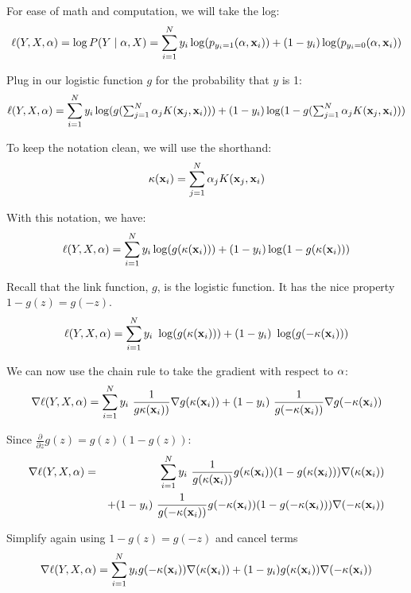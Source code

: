 \documentclass[11pt]{article}
\newcommand{\va}{{\bf \alpha}}
\newcommand{\vx}{{\bf x}}
\newcommand{\vxi}{{\bf x}_i}
\newcommand{\yi}{y_i}
\begin{document}
For ease of math and computation, we will take the log:
\begin{equation}
\ell(Y,X,\va) = \log P(Y \mid \va, X) = \sum_{i=1}^N{ \yi \log(p_{\yi=1}(\va, \vxi)) + (1-\yi)\log(p_{\yi=0}(\va, \vxi))}
\end{equation}

Plug in our logistic function $g$ for the probability that $y$ is 1:
\begin{equation}
\ell(Y,X,\va) = \sum_{i=1}^N{ y_i \log( g(\textstyle\sum_{j=1}^N \alpha_j K(\vx_j, \vx_i) ) ) + (1-y_i) \log( 1-g(\textstyle\sum_{j=1}^N \alpha_j K(\vx_j, \vx_i) ) )}
\end{equation}

To keep the notation clean, we will use the shorthand:
\begin{equation}
\kappa(\vxi) = \sum_{j=1}^N \alpha_j K(\vx_j, \vx_i)
\end{equation}

With this notation, we have:
\begin{equation}
\ell(Y,X,\va) = \sum_{i=1}^N{ y_i \log( g(\kappa(\vxi)  ) ) + (1-y_i) \log( 1-g(\kappa(\vxi)  ) )}
\end{equation}

Recall that the link function, $g$, is the logistic function. It has the nice property $1 - g(z) = g(-z)$.
\begin{equation}
\ell(Y,X,\va) = \sum_{i=1}^N{ y_i\ \log( g(\kappa(\vxi) ) ) + (1-y_i)\ \log( g(-\kappa(\vxi) ) )}
\end{equation}

We can now use the chain rule to take the gradient with respect to $\va$:
\begin{equation}
\nabla \ell(Y,X,\va) = \sum_{i=1}^N 
	y_i\ \frac{1}{g\kappa(\vxi) )} \nabla g(\kappa(\vxi) ) 
	 + (1-y_i)\ \frac{1}{g(-\kappa(\vxi))} \nabla g(-\kappa(\vxi)) 
\end{equation}

Since $\frac{\partial}{\partial z}g(z) = g(z)(1-g(z))$:
\begin{eqnarray}
\nabla \ell(Y,X,\va) &=& \sum_{i=1}^N 
	 y_i\ \frac{1}{g(\kappa(\vxi) )} g(\kappa(\vxi)) (1-g(\kappa(\vxi) )) \nabla (\kappa(\vxi)) \\
& & 	+ (1-y_i)\ \frac{1}{g(-\kappa(\vxi) )} g(-\kappa(\vxi) ) (1-g(-\kappa(\vxi) )) \nabla (-\kappa(\vxi) )
\end{eqnarray}

Simplify again using $1-g(z) = g(-z)$ and cancel terms
\begin{equation}
\nabla \ell(Y,X,\va) = \sum_{i=1}^N{
	y_i g(-\kappa(\vxi) ) \nabla(\kappa(\vxi) )
	+ (1-y_i) g(\kappa(\vxi) ) \nabla (-\kappa(\vxi) )
}
\end{equation}
\end{document}
